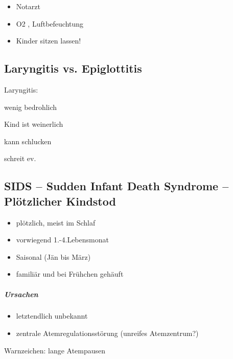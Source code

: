 \begin{itemize}
\item {\mdseries\color[rgb]{0.0,0.0,0.5019608}
Notarzt}

\item {\mdseries\color[rgb]{0.0,0.0,0.5019608}
O2 , Luftbefeuchtung}

\item {\mdseries\color[rgb]{0.0,0.0,0.5019608}
Kinder sitzen lassen!}

\end{itemize}


\subsection{Laryngitis vs. Epiglottitis}

{\mdseries
Laryngitis:}

{\mdseries
wenig bedrohlich}

{\mdseries
Kind ist weinerlich}

{\mdseries
kann schlucken}

{\mdseries
schreit ev.}

\subsection{SIDS -- Sudden Infant Death Syndrome -- Plötzlicher Kindstod}

{\mdseries
{\quotedblbase}}

\begin{itemize}
\item plötzlich, meist im Schlaf

\item vorwiegend 1.-4.Lebensmonat

\item Saisonal (Jän bis März)

\item familiär und bei Fr\"uhchen gehäuft

\end{itemize}
\subparagraph*{
Ursachen}

\begin{itemize}
\item letztendlich unbekannt

\item zentrale Atemregulationsstörung (unreifes  Atemzentrum?)

\end{itemize}
{\mdseries
Warnzeichen:  lange Atempausen}

